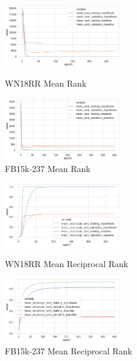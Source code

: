 \begin{figure}[H]
	\parbox{.5\linewidth}{
   		\centering
    		\includegraphics[width=0.45\textwidth, height=0.2\textheight]{WN18RR_mean_rank_Results}
		\caption{WN18RR Mean Rank}
		}
	\hfill
	\parbox{.5\linewidth}{
   		\centering
		\includegraphics[width=0.45\textwidth, height=0.2\textheight]{FB15k-237_mean_rank_Results}
		\caption{FB15k-237 Mean Rank}
		}
\end{figure}


\begin{figure}[H]
	\parbox{.5\linewidth}{
   		\centering
    		\includegraphics[width=0.45\textwidth, height=0.2\textheight]{WN18RR_mean_reciprocal_rank_Results}
		\caption{WN18RR Mean Reciprocal Rank}
		}
	\hfill
	\parbox{.5\linewidth}{
   		\centering
		\includegraphics[width=0.45\textwidth, height=0.2\textheight]{FB15k-237_mean_reciprocal_rank_Results}
		\caption{FB15k-237 Mean Reciprocal Rank}
		}
\end{figure}

